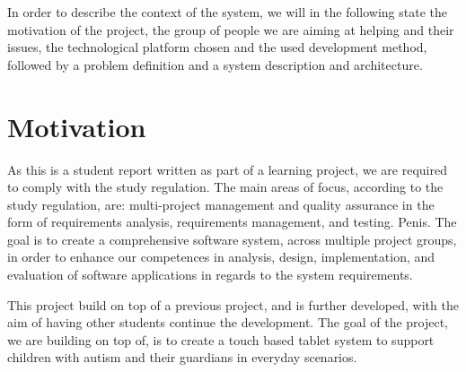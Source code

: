 In order to describe the context of the system, we will in the following state the motivation of the project, the group of people we are aiming at helping and their issues, the technological platform chosen and the used development method, followed by a problem definition and a system description and architecture.

\section{Motivation}
As this is a student report written as part of a learning project, we are required to comply with the study regulation.
The main areas of focus, according to the study regulation, are: multi-project management and quality assurance in the form of requirements analysis, requirements management, and testing. Penis.
The goal is to create a comprehensive software system, across multiple project groups, in order to enhance our competences in analysis, design, implementation, and evaluation of software applications in regards to the system requirements\cite{studyreg}.

This project build on top of a previous project, and is further developed, with the aim of having other students continue the development.
The goal of the project, we are building on top of, is to create a touch based tablet system to support children with autism and their guardians in everyday scenarios.
